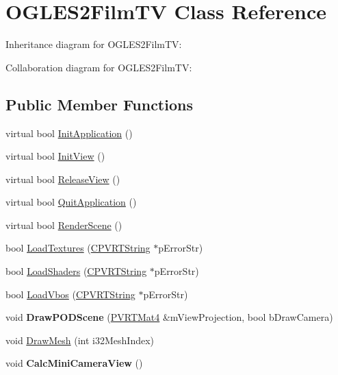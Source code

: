\hypertarget{class_o_g_l_e_s2_film_t_v}{\section{O\+G\+L\+E\+S2\+Film\+T\+V Class Reference}
\label{class_o_g_l_e_s2_film_t_v}
}


Inheritance diagram for O\+G\+L\+E\+S2\+Film\+T\+V\+:


Collaboration diagram for O\+G\+L\+E\+S2\+Film\+T\+V\+:
\subsection*{Public Member Functions}
\begin{DoxyCompactItemize}
\item 
virtual bool \hyperlink{class_o_g_l_e_s2_film_t_v_a1f8c33c1ea5b80b62d1803a260c5ba51}{Init\+Application} ()
\item 
virtual bool \hyperlink{class_o_g_l_e_s2_film_t_v_a6641a9c6654e329a4bb71e235b614b00}{Init\+View} ()
\item 
virtual bool \hyperlink{class_o_g_l_e_s2_film_t_v_aedd295191190188130e18bc4e2ff06cc}{Release\+View} ()
\item 
virtual bool \hyperlink{class_o_g_l_e_s2_film_t_v_ac4e67dc4c39a303be2ca9e353840c6bc}{Quit\+Application} ()
\item 
virtual bool \hyperlink{class_o_g_l_e_s2_film_t_v_a7e8d28d2bacffb616bd964e74f11e099}{Render\+Scene} ()
\item 
bool \hyperlink{class_o_g_l_e_s2_film_t_v_ac02b046a1039e085096b5352bf78a776}{Load\+Textures} (\hyperlink{class_c_p_v_r_t_string}{C\+P\+V\+R\+T\+String} $\ast$p\+Error\+Str)
\item 
bool \hyperlink{class_o_g_l_e_s2_film_t_v_a072ffe9e259db45c19df51a2a7269057}{Load\+Shaders} (\hyperlink{class_c_p_v_r_t_string}{C\+P\+V\+R\+T\+String} $\ast$p\+Error\+Str)
\item 
bool \hyperlink{class_o_g_l_e_s2_film_t_v_a023192bd1ec1a89db00c7d637e6f549b}{Load\+Vbos} (\hyperlink{class_c_p_v_r_t_string}{C\+P\+V\+R\+T\+String} $\ast$p\+Error\+Str)
\item 
\hypertarget{class_o_g_l_e_s2_film_t_v_af8557a7ba1bfade5b8334d2ccafe88f8}{void {\bfseries Draw\+P\+O\+D\+Scene} (\hyperlink{struct_p_v_r_t_mat4}{P\+V\+R\+T\+Mat4} \&m\+View\+Projection, bool b\+Draw\+Camera)}\label{class_o_g_l_e_s2_film_t_v_af8557a7ba1bfade5b8334d2ccafe88f8}

\item 
void \hyperlink{class_o_g_l_e_s2_film_t_v_ac78b2081ed983e6750797b20f9ad4e00}{Draw\+Mesh} (int i32\+Mesh\+Index)
\item 
\hypertarget{class_o_g_l_e_s2_film_t_v_ab2bff2b042a1235b85ed06a79b5fdd16}{void {\bfseries Calc\+Mini\+Camera\+View} ()}\label{class_o_g_l_e_s2_film_t_v_ab2bff2b042a1235b85ed06a79b5fdd16}

\end{DoxyCompactItemize}


